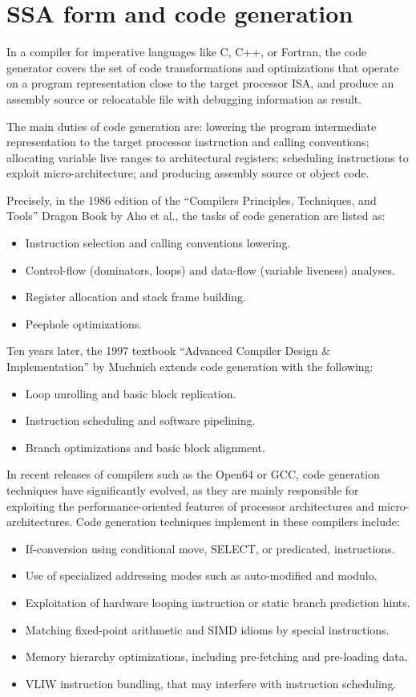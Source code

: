 \chapter{SSA form and code generation }
\label{chap:ssa-codegen}

In a compiler for imperative languages like C, C++, or Fortran, the code
generator covers the set of code transformations and optimizations that operate
on a program representation close to the target processor ISA, and produce an
assembly source or relocatable file with debugging information as result.

The main duties of code generation are: lowering the program intermediate
representation to the target processor instruction and calling conventions;
allocating variable live ranges to architectural registers; scheduling
instructions to exploit micro-architecture; and producing assembly source or
object code.

Precisely, in the 1986 edition of
the ``Compilers Principles, Techniques, and Tools'' Dragon Book by Aho et al.,
the tasks of code generation are listed as:
\begin{itemize}
\item Instruction selection and calling conventions lowering.
\item Control-flow (dominators, loops) and data-flow (variable liveness) analyses.
\item Register allocation and stack frame building.
\item Peephole optimizations.
\end{itemize}
Ten years later, the 1997 textbook ``Advanced Compiler Design \& Implementation''
by Muchnich extends code generation with the following: \begin{itemize}
\item Loop unrolling and basic block replication.
\item Instruction scheduling and software pipelining.
\item Branch optimizations and basic block alignment.
\end{itemize}
In recent releases of compilers such as the Open64 or GCC, code generation
techniques have significantly evolved, as they are mainly responsible for
exploiting the performance-oriented features of processor architectures and
micro-architectures. Code generation techniques implement in these compilers
include: \begin{itemize}
\item If-conversion using conditional move, SELECT, or predicated, instructions.
\item Use of specialized addressing modes such as auto-modified and modulo.
\item Exploitation of hardware looping instruction or static branch prediction
hints.
\item Matching fixed-point arithmetic and SIMD idioms by special instructions.
\item Memory hierarchy optimizations, including pre-fetching and pre-loading
data.
\item VLIW instruction bundling, that may interfere with instruction
scheduling.
\end{itemize}

